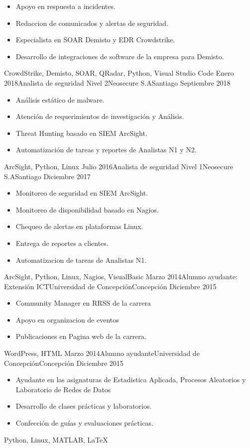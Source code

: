 \begin{experiences}
{\begin{itemize}
        \item Apoyo en respuesta a incidentes.                   
        \item Redaccion de comunicados y alertas de seguridad.                          
        \item Especialista en SOAR Demisto y EDR Crowdstrike.                                                      
        \item Desarrollo de integraciones de software de la empresa para Demisto.
      \end{itemize}
    }{CrowdStrike, Demisto, SOAR, QRadar, Python, Visual Studio Code}
  \emptySeparator
  \experience
  {Enero 2018}{Analista de seguridad Nivel 2}{Neosecure S.A}{Santiago}
  {Septiembre 2018}{
    \begin{itemize}
      \item Análisis estático de malware.
      \item Atención de requerimientos de investigación y Análisis.
      \item Threat Hunting basado en SIEM ArcSight.
      \item Automatización de tareas y reportes de Analistas N1 y N2.
    \end{itemize}
  }{ArcSight, Python, Linux}
  \emptySeparator
  \experience
  {Julio 2016}{Analista de seguridad Nivel 1}{Neosecure S.A}{Santiago}
  {Diciembre 2017}{
    \begin{itemize}
      \item Monitoreo de seguridad en SIEM ArcSight.
      \item Monitoreo de disponibilidad basado en Nagios.
      \item Chequeo de alertas en plataformas Linux.
      \item Entrega de reportes a clientes.
      \item Automatizacion de tareas de Analistas N1.
    \end{itemize}
  }{ArcSight, Python, Linux, Nagios, VisualBasic}
  \emptySeparator
  \experience
  {Marzo 2014}{Alumno ayudante: Extensión ICT}{Universidad de Concepción}{Concepción}
  {Diciembre 2015}{
    \begin{itemize}
      \item Community Manager en RRSS de la carrera
      \item Apoyo en organizacion de eventos
      \item Publicaciones en Pagina web de la carrera.
    \end{itemize}
  }{WordPress, HTML}
  \emptySeparator
  \experience
  {Marzo 2014}{Alumno ayudante}{Universidad de Concepción}{Concepción}
  {Diciembre 2015}{
    \begin{itemize}
      \item Ayudante en las asignaturas de Estadistica Aplicada, Procesos Aleatorios y Laboratorio de Redes de Datos
      \item Desarrollo de clases prácticas y laboratorios.
      \item Confección de guías y evaluaciones prácticas.
    \end{itemize}
  }{Python, Linux, MATLAB, \LaTeX}
\end{experiences}
